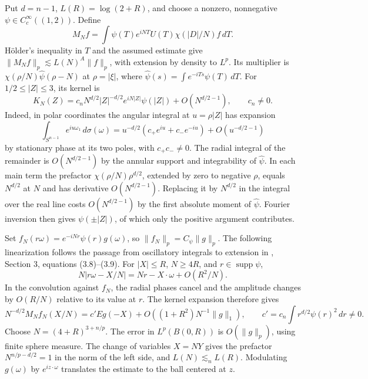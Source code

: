 Put \(d=n-1\), \(L(R)=\log(2+R)\), and choose a nonzero, nonnegative \(\psi\in C_c^\infty((1,2))\). Define
\[
 M_N f=\int\psi(T)e^{iNT}U(T)\chi(|D|/N)f\,dT .
\]
Hölder's inequality in \(T\) and the assumed estimate give \(\|M_N f\|_p\lesssim L(N)^A\|f\|_p\), with extension by density to \(L^p\). Its multiplier is \(\chi(\rho/N)\widehat\psi(\rho-N)\) at \(\rho=|\xi|\), where \(\widehat\psi(s)=\int e^{-iTs}\psi(T)\,dT\). For \(1/2\le |Z|\le3\), its kernel is
\[
 K_N(Z)=c_n N^{d/2}|Z|^{-d/2}e^{iN|Z|}\psi(|Z|)+O(N^{d/2-1}),\qquad c_n\ne0 .
\]
Indeed, in polar coordinates the angular integral at \(u=\rho|Z|\) has expansion
\[
 \int_{S^{n-1}}e^{iu\omega_1}\,d\sigma(\omega)
   =u^{-d/2}(c_+e^{iu}+c_-e^{-iu})+O(u^{-d/2-1})
\]
by stationary phase at its two poles, with \(c_+c_-\ne0\). The radial integral of the remainder is \(O(N^{d/2-1})\) by the annular support and integrability of \(\widehat\psi\). In each main term the prefactor \(\chi(\rho/N)\rho^{d/2}\), extended by zero to negative \(\rho\), equals \(N^{d/2}\) at \(N\) and has derivative \(O(N^{d/2-1})\). Replacing it by \(N^{d/2}\) in the integral over the real line costs \(O(N^{d/2-1})\) by the first absolute moment of \(\widehat\psi\). Fourier inversion then gives \(\psi(\pm|Z|)\), of which only the positive argument contributes.

Set \(f_N(r\omega)=e^{-iNr}\psi(r)g(\omega)\), so \(\|f_N\|_p=C_\psi\|g\|_p\). The following linearization follows the passage from oscillatory integrals to extension in \cite{r-38}, Section 3, equations (3.8)--(3.9). For \(|X|\le R\), \(N\ge4R\), and \(r\in\operatorname{supp}\psi\),
\[
 N|r\omega-X/N|=Nr-X\cdot\omega+O(R^2/N).
\]
In the convolution against \(f_N\), the radial phases cancel and the amplitude changes by \(O(R/N)\) relative to its value at \(r\). The kernel expansion therefore gives
\[
 N^{-d/2}M_N f_N(X/N)
  =c' Eg(-X)+O((1+R^2)N^{-1}\|g\|_1),\qquad
 c'=c_n\int r^{d/2}\psi(r)^2\,dr\ne0.
\]
Choose \(N=(4+R)^{3+n/p}\). The error in \(L^p(B(0,R))\) is \(O(\|g\|_p)\), using finite sphere measure. The change of variables \(X=NY\) gives the prefactor \(N^{n/p-d/2}=1\) in the norm of the left side, and \(L(N)\lesssim_n L(R)\). Modulating \(g(\omega)\) by \(e^{iz\cdot\omega}\) translates the estimate to the ball centered at \(z\).
